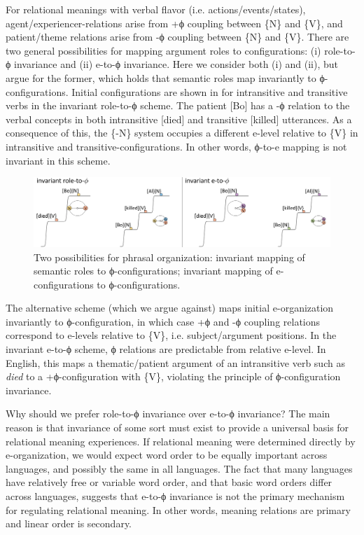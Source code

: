 For relational meanings with verbal flavor (i.e. actions/events/states), agent/experiencer-relations arise from +ϕ coupling between \{N\} and \{V\}, and patient/theme relations arise from -ϕ coupling between \{N\} and \{V\}. There are two general possibilities for mapping argument roles to configurations: (i) role-to-ϕ invariance and (ii) e-to-ϕ invariance. Here we consider both (i) and (ii), but argue for the former, which holds that semantic roles map invariantly to ϕ-configurations. Initial configurations are shown in {} for intransitive and transitive verbs in the invariant role-to-ϕ scheme. The patient [Bo] has a -ϕ relation to the verbal concepts in both intransitive [died] and transitive [killed] utterances. As a consequence of this, the \{-N\} system occupies a different e-level relative to \{V\} in intransitive and transitive-configurations. In other words, ϕ-to-e mapping is not invariant in this scheme.

  
\begin{figure}
\includegraphics[width=\textwidth]{figures/Tilsen-img71.png}
\caption{Two possibilities for phrasal organization: invariant mapping of semantic roles to ϕ-configurations; invariant mapping of e-configurations to ϕ-configurations.}
\label{fig:4:21}
\end{figure}
 

  The alternative scheme (which we argue against) maps initial e-organization invariantly to ϕ-configuration, in which case +ϕ and -ϕ coupling relations correspond to e-levels relative to \{V\}, i.e. subject/argument positions. In the invariant e-to-ϕ scheme, ϕ relations are predictable from relative e-level. In English, this maps a thematic/patient argument of an intransitive verb such as \textit{died} to a +ϕ-configuration with \{V\}, violating the principle of ϕ-configuration invariance.

  Why should we prefer role-to-ϕ invariance over e-to-ϕ invariance? The main reason is that invariance of some sort must exist to provide a universal basis for relational meaning experiences. If relational meaning were determined directly by e-organization, we would expect word order to be equally important across languages, and possibly the same in all languages. The fact that many languages have relatively free or variable word order, and that basic word orders differ across languages, suggests that e-to-ϕ invariance is not the primary mechanism for regulating relational meaning. In other words, meaning relations are primary and linear order is secondary.

